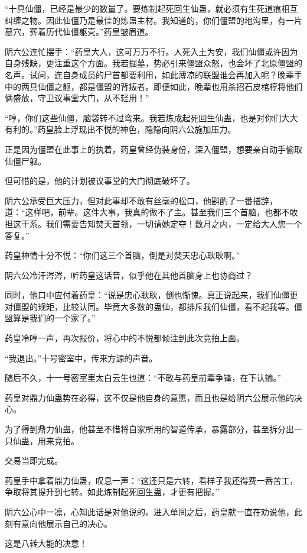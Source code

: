 \begin{this_body}
“十具仙僵，已经是最少的数量了。要炼制起死回生仙蛊，就必须有生死道痕相互纠缠之物。因此仙僵乃是最佳的炼蛊主材。我知道的，你们僵盟的地沟里，有一片墓穴，葬着历代仙僵躯壳。”药皇皱眉道。

阴六公连忙摆手：“药皇大人，这可万万不行。人死入土为安，我们仙僵或许因为自身残缺，更注重这个方面。我若掘墓，势必引来僵盟众怒，也会坏了北原僵盟的名声。试问，连自身成员的尸首都要利用，如此薄凉的联盟谁会再加入呢？晚辈手中的两具仙僵之躯，都是僵盟的背叛者。即便如此，晚辈也用杀招石皮棺椁将他们俩盛放，守卫议事堂大门，从不轻用！”

“哼，你们这些仙僵，脑袋转不过弯来。我若炼成起死回生仙蛊，也是对你们大大有利的。”药皇脸上浮现出不悦的神色，隐隐向阴六公施加压力。

正是因为僵盟在此事上的执着，药皇曾经伪装身份，深入僵盟，想要亲自动手偷取仙僵尸躯。

但可惜的是，他的计划被议事堂的大门彻底破坏了。

阴六公承受巨大压力，但对此事却不敢有丝毫的松口，他斟酌了一番措辞，道：“这样吧，前辈。这件大事，我真的做不了主。甚至我们三个首脑，也都不敢担这干系。我们需要告知焚天首领，一切请她定夺！数月之内，一定给大人您一个答复。”

药皇神情十分不悦：“你们这三个首脑，倒是对焚天忠心耿耿啊。”

阴六公冷汗涔涔，听药皇这话音，似乎他在其他首脑身上也协商过？

同时，他口中应付着药皇：“说是忠心耿耿，倒也惭愧。真正说起来，我们仙僵更对僵盟的规矩，比较认同。毕竟大多数的蛊仙，都排斥我们仙僵，看不起我等。僵盟算是我们的一个家了。”

药皇冷哼一声，再次报价，将心中的不悦都倾注到此次竞拍上面。

“我退出。”十号密室中，传来方源的声音。

随后不久，十一号密室里太白云生也道：“不敢与药皇前辈争锋，在下认输。”

药皇对鼎力仙蛊势在必得，这不仅是他自身的意愿，而且也是给阴六公展示他的决心。

为了得到鼎力仙蛊，他甚至不惜将自家所用的智道传承，暴露部分，甚至拆分出一只仙蛊，用来竞拍。

交易当即完成。

药皇手中拿着鼎力仙蛊，叹息一声：“这还只是六转，看样子我还得费一番苦工，争取将其提升到七转。如此炼制起死回生蛊，才更有把握。”

阴六公心中一凛，心知此话是对他说的。进入单间之后，药皇就一直在劝说他，此刻有意向他展示自己的决心。

这是八转大能的决意！


\end{this_body}
